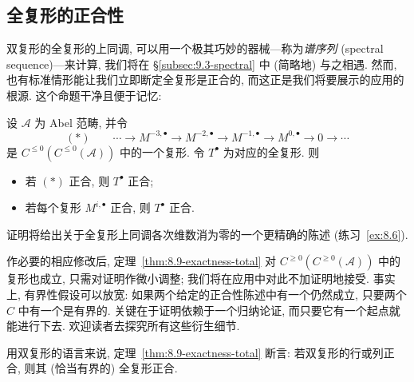 \subsection{全复形的正合性}
\label{subsec:8.3-exactness-total}

双复形的全复形的上同调, 可以用一个极其巧妙的器械---称为\emph{谱序列} (spectral sequence)---来计算, 我们将在 \S\ref{subsec:9.3-spectral} 中 (简略地) 与之相遇. 然而, 也有标准情形能让我们立即断定全复形是正合的, 而这正是我们将要展示的应用的根源. 这个命题干净且便于记忆:

\begin{theorem}\label{thm:8.9-exactness-total}
设 $\mathcal{A}$ 为 Abel 范畴, 并令
\[
(*)\qquad \cdots \longrightarrow M^{-3,\bullet} \longrightarrow M^{-2,\bullet} \longrightarrow M^{-1,\bullet} \longrightarrow M^{0,\bullet} \longrightarrow 0 \longrightarrow \cdots
\]
是 $C^{\le 0}(C^{\le 0}(\mathcal{A}))$ 中的一个复形. 令 $T^\bullet$ 为对应的全复形. 则
\begin{itemize}
\item 若 $(*)$ 正合, 则 $T^\bullet$ 正合;
\item 若每个复形 $M^{i,\bullet}$ 正合, 则 $T^\bullet$ 正合.
\end{itemize}
证明将给出关于全复形上同调各次维数消为零的一个更精确的陈述 (练习~\ref{ex:8.6}).
\end{theorem}

作必要的相应修改后, 定理~\ref{thm:8.9-exactness-total} 对 $C^{\ge 0}(C^{\ge 0}(\mathcal{A}))$ 中的复形也成立, 只需对证明作微小调整; 我们将在应用中对此不加证明地接受. 事实上, 有界性假设可以放宽: 如果两个给定的正合性陈述中有一个仍然成立, 只要两个 $C$ 中有一个是有界的. 关键在于证明依赖于一个归纳论证, 而只要它有一个起点就能进行下去. 欢迎读者去探究所有这些衍生细节.

用双复形的语言来说, 定理~\ref{thm:8.9-exactness-total} 断言: 若双复形的行或列正合, 则其 (恰当有界的) 全复形正合.

